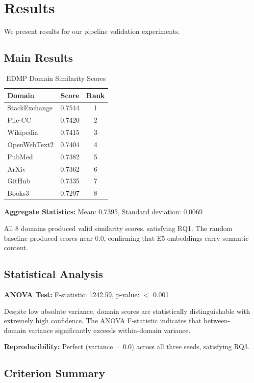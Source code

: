 \section{Results}
\label{sec:results}

We present results for our pipeline validation experiments.

\subsection{Main Results}

\begin{table}[h]
\centering
\caption{EDMP Domain Similarity Scores}
\label{tab:scores}
\begin{tabular}{lcc}
\toprule
\textbf{Domain} & \textbf{Score} & \textbf{Rank} \\
\midrule
StackExchange & 0.7544 & 1 \\
Pile-CC & 0.7420 & 2 \\
Wikipedia & 0.7415 & 3 \\
OpenWebText2 & 0.7404 & 4 \\
PubMed & 0.7382 & 5 \\
ArXiv & 0.7362 & 6 \\
GitHub & 0.7335 & 7 \\
Books3 & 0.7297 & 8 \\
\bottomrule
\end{tabular}
\end{table}

\textbf{Aggregate Statistics:} Mean: 0.7395, Standard deviation: 0.0069

All 8 domains produced valid similarity scores, satisfying RQ1. The random baseline produced scores near 0.0, confirming that E5 embeddings carry semantic content.

\subsection{Statistical Analysis}

\textbf{ANOVA Test:} F-statistic: 1242.59, p-value: $<$ 0.001

Despite low absolute variance, domain scores are statistically distinguishable with extremely high confidence. The ANOVA F-statistic indicates that between-domain variance significantly exceeds within-domain variance.

\textbf{Reproducibility:} Perfect (variance = 0.0) across all three seeds, satisfying RQ3.

\subsection{Criterion Summary}

